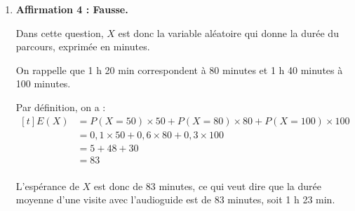 \begin{enumerate}
	L'événement \og{}exactement la moitié des 12 visiteurs opte pour l'audioguide\fg{} est donc l'événement $\{X = 6\}$ : la moitié (6 visiteurs) opte pour l'audioguide, et donc l'autre moitié (les 6 autres visiteurs) refusent l'audioguide.

	Par propriété, on a :\quad $P(X = 6) = \displaystyle \binom{12}{6} \times 0,32^6 \times (1 - 0,32)^6$.

	Or :\quad $\displaystyle \binom{12}{6} = \dfrac{12 !}{6! \times 6!} = 924$

	et :\quad $0,32^6 \times (1-0,32)^6 = 0,32^6 \times 0,68^6 = \left(0,32 \times 0,68\right)^6 = 0,2176^6$.

	On a donc bien :\quad $P(X = 6) = \displaystyle \binom{12}{6} \times 0,32^6 \times (1 - 0,32)^6 = 924 \times 0,2176^6$.

	\item \textbf{Affirmation 4 : Fausse.}

	Dans cette question, $X$ est donc la variable aléatoire qui donne la durée du parcours, exprimée en minutes.

	On rappelle que 1 h 20 min correspondent à 80 minutes et 1 h 40 minutes à 100 minutes.

	Par définition, on a : \quad $\begin{aligned}[t]
		E(X) &= P(X = 50) \times 50 + P(X = 80) \times 80 + P(X = 100) \times 100\\
		&= 0,1 \times 50 + 0,6 \times 80 + 0,3 \times 100\\
		&= 5 + 48 + 30\\
		&= 83\\
	\end{aligned}$

	L'espérance de $X$ est donc de 83 minutes, ce qui veut dire que la durée moyenne d'une visite avec l'audioguide est de 83 minutes, soit 1 h 23 min.
	\end{enumerate}

